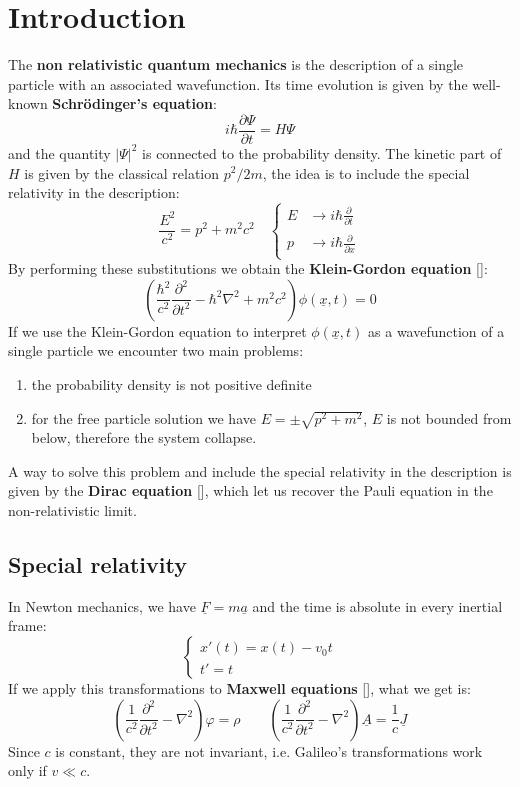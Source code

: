 \documentclass[../main.tex]{subfiles}
\begin{document}
\setchapterpreamble[u]{\margintoc}
\chapter[Introduction]{Introduction\footnotemark[0]}

The \textbf{non relativistic quantum mechanics} is the description of a single particle with an associated wavefunction. Its time evolution is given by the well-known \textbf{Schr\"odinger's equation}:
\[
i\hbar\frac{\partial\Psi}{\partial t}=H\Psi
\]
and the quantity $|\Psi|^2$ is connected to the probability density. The kinetic part of $H$ is given by the classical relation $p^2/2m$, the idea is to include the special relativity in the description:
\[
\frac{E^2}{c^2}=p^2+m^2c^2 \quad
\left\{
\begin{aligned}
E&\xrightarrow[]{}i\hbar\frac{\partial}{\partial t}\\ p&\xrightarrow[]{}i\hbar\frac{\partial}{\partial x}
\end{aligned}
\right.
\]
By performing these substitutions we obtain the \textbf{Klein-Gordon equation} []:
\[
\left(\frac{\hbar^2}{c^2}\frac{\partial^2}{\partial t^2}-\hbar^2\nabla^2+m^2c^2\right)\phi(\underline{x},t)=0
\]
If we use the Klein-Gordon equation to interpret $\phi(\underline{x},t)$ as a wavefunction of a single particle we encounter two main problems:
\begin{enumerate}
    \item the probability density is not positive definite
    \item for the free particle solution we have $E=\pm\sqrt{p^2+m^2}$, $E$ is not bounded from below, therefore the system collapse.
\end{enumerate}
A way to solve this problem and include the special relativity in the description is given by the \textbf{Dirac equation} [], which let us recover the Pauli equation in the non-relativistic limit.
\section{Special relativity}
In Newton mechanics, we have $\underline{F}=m\underline{a}$ and the time is absolute in every inertial frame:
\[
\begin{cases}
x'(t)=x(t)-v_0t\\
t'=t
\end{cases}
\]
If we apply this transformations to \textbf{Maxwell equations} [], what we get is:
\[
\left(\frac{1}{c^2}\frac{\partial^2}{\partial t^2}-\nabla^2\right)\varphi=\rho \qquad \left(\frac{1}{c^2}\frac{\partial^2}{\partial t^2}-\nabla^2\right)\underline{A}=\frac{1}{c}\underline{J}
\]
Since $c$ is constant, they are not invariant, i.e. Galileo's transformations work only if $v\ll c$.
\end{document}
